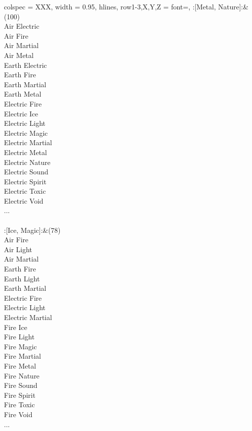 \begin{longtblr}[
	caption = {2v2 Defending Weak},
	label = {2v2-Defending-Weak},
]{
	colspec = {XXX}, width = 0.95\linewidth,
	hlines,
	row{1-3,X,Y,Z} = {font=\bfseries},
}
	:[Metal, Nature]:&{(100)\\
	Air Electric \\
	Air Fire \\
	Air Martial \\
	Air Metal \\
	Earth Electric \\
	Earth Fire \\
	Earth Martial \\
	Earth Metal \\
	Electric Fire \\
	Electric Ice \\
	Electric Light \\
	Electric Magic \\
	Electric Martial \\
	Electric Metal \\
	Electric Nature \\
	Electric Sound \\
	Electric Spirit \\
	Electric Toxic \\
	Electric Void \\
	...\\
	}\\

	:[Ice, Magic]:&{(78)\\
	Air Fire \\
	Air Light \\
	Air Martial \\
	Earth Fire \\
	Earth Light \\
	Earth Martial \\
	Electric Fire \\
	Electric Light \\
	Electric Martial \\
	Fire Ice \\
	Fire Light \\
	Fire Magic \\
	Fire Martial \\
	Fire Metal \\
	Fire Nature \\
	Fire Sound \\
	Fire Spirit \\
	Fire Toxic \\
	Fire Void \\
	...\\
	}\\


\end{longtblr}
